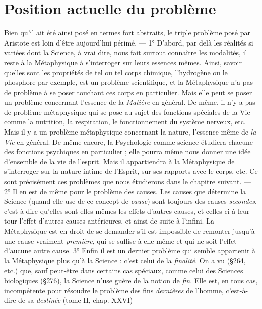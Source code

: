 \section{Position actuelle du problème}%
Bien qu'il ait été
ainsi posé en termes fort abstraits, le triple problème posé par Aristote
est loin d’être aujourd’hui périmé. — 1° D’abord, par delà les réalités
si variées dont la Science, à vrai dire, nous fait surtout connaître les
modalités, il reste à la Métaphysique à s'interroger sur leurs essences
mêmes. Ainsi, savoir quelles sont les propriétés de tel ou tel corps
chimique, l’hydrogène ou le phosphore par exemple, est
un problème scientifique, et la Métaphysique n’a pas de
problème à se poser touchant ces corps en particulier. Mais
elle peut se poser un problème concernant l’essence de
la {\it Matière} en général. De même, il n’y a pas de problème
métaphysique qui se pose au sujet des fonctions
spéciales de la Vie comme la nutrition, la respiration,
le fonctionnement du système nerveux, etc. Mais il
y a un problème métaphysique concernant la nature,
l'essence même de {\it la Vie} en général. De même encore, la
Psychologie comme science étudiera chacune des fonctions
psychiques en particulier ; elle pourra même nous
donner une idée d’ensemble de la vie de l’esprit. Mais il
appartiendra à la Métaphysique de s'interroger sur la
nature intime de l'Esprit, sur ses rapports avec le
corps, etc. Ce sont précisément ces problèmes que nous
étudierons dans le chapitre suivant. — 2° Il en est de
même pour le problème des causes. Les causes que détermine
la Science (quand elle use de ce concept de {\it cause})
sont toujours des causes
{\it secondes}, c’est-à-dire qu’elles sont elles-mêmes les effets d’autres
causes, et celles-ci à leur tour l’effet d’autres causes antérieures, et
ainsi de suite à l'infini. La Métaphysique est en droit de se demander
s’il est impossible de remonter jusqu’à une cause vraiment {\it première},
qui se suffise à elle-même et qui ne soit l’effet d'aucune autre cause.
3° Enfin il est un dernier problème qui semble appartenir à la Métaphysique
plus qu’à la Science : c’est celui de la {\it finalité}. On a vu
(\S 264, etc.) que, sauf peut-être dans certains cas spéciaux, comme
celui des Sciences biologiques (\S 276), la Science n’use guère de la
notion de {\it fin}. Elle est, en tous cas, incompétente pour résoudre le
problème des fins {\it dernières} de l’homme, c’est-à-dire de sa {\it destinée}
(tome II, chap. XXVI)

